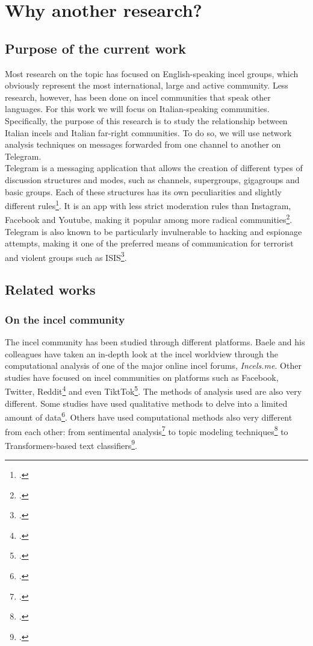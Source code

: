 \documentclass[a4paper,twoside,12pt, openany]{book}
\begin{document}
\section{Why another research?}
\subsection*{Purpose of the current work}
Most research on the topic has focused on English-speaking incel groups, which obviously represent the most international, large and active community. Less research, however, has been done on incel communities that speak other languages. For this work we will focus on Italian-speaking communities. Specifically, the purpose of this research is to study the relationship between Italian incels and Italian far-right communities. To do so, we will use network analysis techniques on messages forwarded from one channel to another on Telegram. \\

Telegram is a messaging application that allows the creation of  different types of discussion structures and modes, such as channels, supergroups, gigagroups and basic groups. Each of these structures has its own peculiarities and slightly different rules\footcite{channelTelegram}. It is an app with less strict moderation rules than Instagram, Facebook and Youtube, making it popular among more radical communities\footcite{rogers2020}. Telegram is also known to be particularly invulnerable to hacking and espionage attempts, making it one of the preferred means of communication for terrorist and violent groups such as ISIS\footcite{weimann2016}.
\subsection*{Related works}

\subsubsection*{On the incel community}
The incel community has been studied through different platforms. Baele and his colleagues have taken an in-depth look at the incel worldview through the computational analysis of one of the major online incel forums, \emph{Incels.me}. Other studies have focused on incel communities on platforms such as Facebook, Twitter, Reddit\footcite{deroos2024} and even TiktTok\footcite{solea2023}. The methods of analysis used are also very different. Some studies have used qualitative methods to delve into a limited amount of data\footcite{solea2023}. Others have used computational methods also very different from each other: from sentimental analysis\footcite{hajarian2021} to topic modeling techniques\footcite{jelodar2021} to Transformers-based text classifiers\footcite{pelzer2021}.
\end{document}
